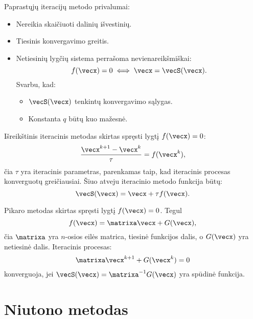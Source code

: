 




Paprastųjų iteracijų metodo privalumai:
\begin{itemize}
  \item Nereikia skaičiuoti dalinių išvestinių.
  \item Tiesinis konvergavimo greitis.
  \item Netiesinių lygčių sistema perrašoma nevienareikšmiškai:
    \begin{equation*}
      f(\vecx) = 0 \iff \vecx = \vecS(\vecx).
    \end{equation*}
    Svarbu, kad:
    \begin{itemize}
      \item $\vecS(\vecx)$ tenkintų konvergavimo sąlygas.
      \item Konstanta $q$ būtų kuo mažesnė.
    \end{itemize}
\end{itemize}



\begin{defn}
  Išreikštinis iteracinis metodas skirtas spręsti lygtį $f(\vecx) = 0$:
  \begin{equation*}
    \frac{\vecx^{k+1} - \vecx^{k}}{\tau} = f(\vecx^{k}),
  \end{equation*}
  čia $\tau$ yra iteracinis parametras, parenkamas taip, kad iteracinis
  procesas konverguotų greičiausiai. Šiuo atveju iteracinio metodo
  funkcija būtų:
  \begin{equation*}
    \vecS(\vecx) = \vecx + \tau f(\vecx).
  \end{equation*}
\end{defn}

\begin{defn}
  Pikaro metodas skirtas spręsti lygtį $f(\vecx) = 0$. Tegul
  \begin{equation*}
    f(\vecx) = \matrixa \vecx + G(\vecx),
  \end{equation*}
  čia $\matrixa$ yra $n$-osios eilės matrica, tiesinė funkcijos dalis, o
  $G(\vecx)$ yra netiesinė dalis. Iteracinis procesas:
  \begin{equation*}
    \matrixa \vecx^{k+1} + G(\vecx^{k}) = 0
  \end{equation*}
  konverguoja, jei $\vecS(\vecx) = \matrixa^{-1}G(\vecx)$ yra spūdinė
  funkcija.
\end{defn}

\section{Niutono metodas}

